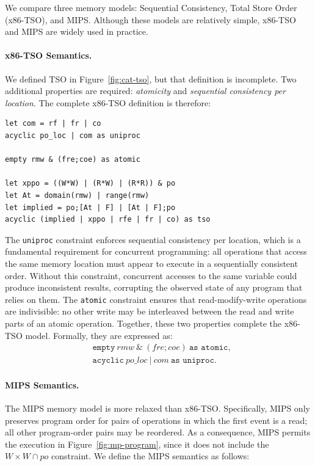 We compare three memory models: Sequential Consistency, Total Store Order (x86-TSO), 
and MIPS. Although these models are relatively simple, x86-TSO and MIPS are 
widely used in practice.

\paragraph{x86-TSO Semantics.}
We defined TSO in Figure~\ref{fig:cat-tso}, but that definition is incomplete. Two 
additional properties are required: \emph{atomicity} and \emph{sequential consistency 
per location}. The complete x86-TSO definition is therefore:

\begin{lstlisting}[]
let com = rf | fr | co
acyclic po_loc | com as uniproc

empty rmw & (fre;coe) as atomic

let xppo = ((W*W) | (R*W) | (R*R)) & po
let At = domain(rmw) | range(rmw)
let implied = po;[At | F] | [At | F];po
acyclic (implied | xppo | rfe | fr | co) as tso
\end{lstlisting}

The \texttt{uniproc} constraint enforces sequential consistency per location, which is a 
fundamental requirement for concurrent programming: all operations that access the same 
memory location must appear to execute in a sequentially consistent order. Without this 
constraint, concurrent accesses to the same variable could produce inconsistent results, 
corrupting the observed state of any program that relies on them. The \texttt{atomic} 
constraint ensures that read-modify-write operations are indivisible: no other write may 
be interleaved between the read and write parts of an atomic operation. Together, these 
two properties complete the x86-TSO model. Formally, they are expressed as:
%
\begin{align}
  &\texttt{empty}\ \mathit{rmw}\ \&\ (\mathit{fre};\mathit{coe})\ \texttt{as atomic}, \\
  &\texttt{acyclic}\ \mathit{po\_loc}\ |\ \mathit{com}\ \texttt{as uniproc}.
\end{align}

\paragraph{MIPS Semantics.}
The MIPS memory model is more relaxed than x86-TSO. Specifically, MIPS only preserves 
program order for pairs of operations in which the first event is a read; all other 
program-order pairs may be reordered. As a consequence, MIPS permits the execution in 
Figure~\ref{fig:mp-program}, since it does not include the $W{\times}W \cap \mathit{po}$ 
constraint. We define the MIPS semantics as follows:

